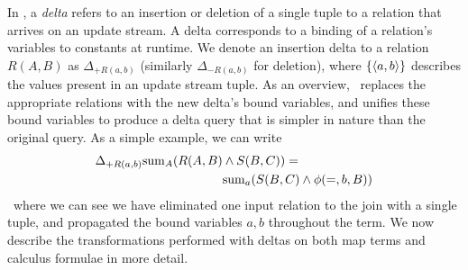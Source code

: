 In \compiler, a \textit{delta} refers to an insertion or deletion of a single
tuple to a relation that arrives on an update stream. A delta corresponds to a
binding of a relation's variables to constants at runtime. We denote an
insertion delta to a relation $R(A,B)$ as $\Delta_{+R(a,b)}$ (similarly
$\Delta_{-R(a,b)}$ for deletion), where $\{{\langle a,b\rangle}\}$ describes the values
present in an update stream tuple. As an overview, \compiler\ replaces the
appropriate relations with the new delta's bound variables, and unifies these
bound variables to produce a delta query that is simpler in nature than the
original query.
As a simple example, we can write
\begin{align*}
\Delta_{+R(a,b)} \mathrm{sum}_{A}(R(A,B) & \wedge S(B,C)) =\\
& \mathrm{sum}_{a}(S(B,C) \wedge \phi(=,b,B))
\end{align*}
\noindent~where we can see we have eliminated one input relation to the join
with a single tuple, and propagated the bound variables $a,b$ throughout the
term.  We now describe the transformations performed with deltas on both map
terms and calculus formulae in more detail.

